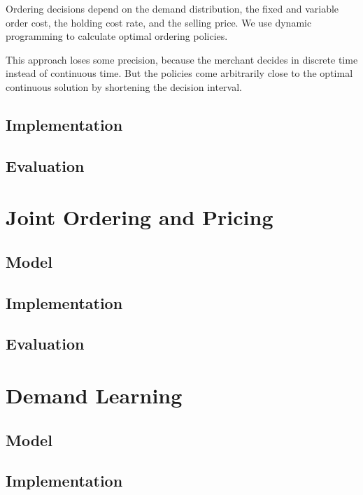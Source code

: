 Ordering decisions depend on the demand distribution, the fixed and variable order cost, the holding cost rate, and the selling price.
We use dynamic programming to calculate optimal ordering policies.

This approach loses some precision, because the merchant decides in discrete time instead of continuous time.
But the policies come arbitrarily close to the optimal continuous solution by shortening the decision interval.


\subsection{Implementation}
\subsection{Evaluation}

\section{Joint Ordering and Pricing}
\subsection{Model}
\subsection{Implementation}
\subsection{Evaluation}

\section{Demand Learning}
\subsection{Model}
\subsection{Implementation}
